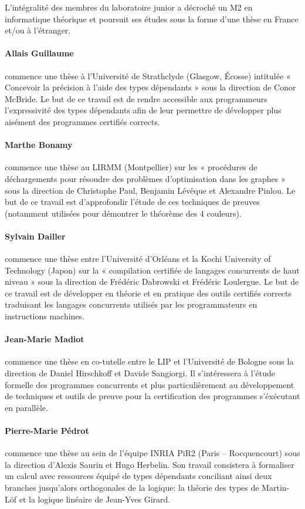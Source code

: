 
L'intégralité des membres du laboratoire junior a décroché un M2
en informatique théorique et poursuit ses études sous la forme
d'une thèse en France et/ou à l'étranger.

\paragraph{Allais Guillaume} commence une thèse à l'Université de
Strathclyde (Glasgow, Écosse) intitulée « Concevoir la précision
à l'aide des types dépendants » sous la direction de Conor McBride.
Le but de ce travail est de rendre accessible aux programmeurs
l'expressivité des types dépendants afin de leur permettre de
développer plus aisément des programmes certifiés corrects.

\paragraph{Marthe Bonamy} commence une thèse au LIRMM (Montpellier)
sur les « procédures de déchargements pour résoudre des problèmes
d'optimisation dans les graphes » sous la direction de Christophe
Paul, Benjamin Lévêque et Alexandre Pinlou.
Le but de ce travail est d'approfondir l'étude de ces techniques de
preuves (notamment utilisées pour démontrer le théorème des 4 couleurs).

\paragraph{Sylvain Dailler} commence une thèse entre
l'Université d'Orléans et la Kochi University of Technology (Japon)
sur la « compilation certifiée de langages concurrents de haut niveau »
sous la direction de Frédéric Dabrowski et Frédéric Loulergue.
Le but de ce travail est de développer en théorie et en pratique des
outils certifiés corrects traduisant les langages concurrents utilisés
par les programmateurs en instructions machines.

\paragraph{Jean-Marie Madiot} commence une thèse en co-tutelle entre
le LIP et l'Université de Bologne sous la direction de Daniel Hirschkoff
et Davide Sangiorgi. Il s'intéressera à l'étude formelle des programmes
concurrents et plus particulièrement au développement de techniques et
outils de preuve pour la certification des programmes s'éxécutant en
parallèle.

\paragraph{Pierre-Marie Pédrot} commence une thèse au sein de l'équipe
INRIA PiR2 (Paris -- Rocquencourt) sous la direction d'Alexis Saurin et Hugo
Herbelin. Son travail consistera à formaliser un  calcul avec ressources
équipé de types dépendants conciliant ainsi deux branches jusqu'alors
orthogonales de la logique: la théorie des types de Martin-Löf et la logique
linéaire de Jean-Yves Girard.

